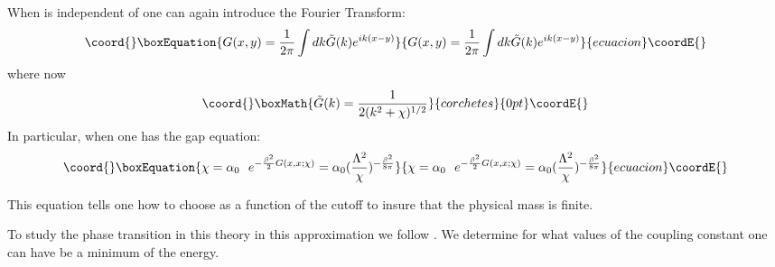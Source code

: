 \documentclass[a4paper,prd,preprint,superscriptaddress,showpacs,byrevtex]{revtex4}
\begin{document}
  When \myHighlight{$\chi$}\coordHE{} is
independent of \coordHE{} one can again introduce the Fourier Transform:
\begin{equation}\coord{}\boxEquation{
G(x,y) = {1 \over 2 \pi} \int dk{\tilde G}(k) e^{i k(x-y)}
}{
G(x,y) = {1 \over 2 \pi} \int dk{\tilde G}(k) e^{i k(x-y)}
}{ecuacion}\coordE{}\end{equation}
where now
\[\coord{}\boxMath{ \tilde{G} (k) = {1 \over 2 (k^2 + \chi)^{1/2}} }{corchetes}{0pt}\coordE{}\]
In particular, when \coordHE{} one has the gap equation:
\begin{equation}\coord{}\boxEquation{
\chi = \alpha_0
~~e^{- {\beta^2 \over 2} G(x,x;\chi)} = \alpha_0
(\frac{\Lambda^2}{\chi})^{-\frac{\beta^2}{8\pi}}
}{
\chi = \alpha_0
~~e^{- {\beta^2 \over 2} G(x,x;\chi)} = \alpha_0
(\frac{\Lambda^2}{\chi})^{-\frac{\beta^2}{8\pi}}
}{ecuacion}\coordE{}\end{equation}

This equation tells one how to choose \coordHE{} as a function of the cutoff
\myHighlight{$\Lambda$}\coordHE{} to
insure  that the physical mass \myHighlight{$\chi$}\coordHE{} is finite.

To study the phase transition in this theory in this approximation we follow
\cite{ref:Coleman} \cite{ref:Boy}.   We determine for what values of
the coupling constant one can have \coordHE{} be a minimum of  the energy.
\end{document}
